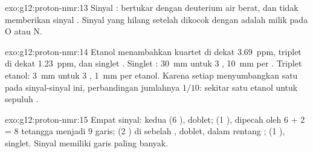 \begin{solution}{exo:g12:proton-nmr:13}
Sinyal :   bertukar dengan deuterium air
berat, dan  tidak memberikan sinyal . Sinyal yang hilang
setelah dikocok dengan  adalah milik  pada O atau N.
\end{solution}

\begin{solution}{exo:g12:proton-nmr:14}
Etanol menambahkan kuartet di dekat \qty{3.69}{ppm}, triplet di dekat
\qty{1.23}{ppm}, dan singlet . Singlet : \qty{30}{mm} untuk
3 , \qty{10}{mm} per  . Triplet etanol: \qty{3}{mm}
untuk 3 , \qty{1}{mm} per  etanol. Karena setiap 
menyumbangkan satu  pada sinyal-sinyal ini, perbandingan
jumlahnya $1/10$: sekitar satu  etanol untuk sepuluh 
.
\end{solution}

\begin{solution}{exo:g12:proton-nmr:15}
Empat sinyal: kedua  (6 ), doblet;  (1 ),
dipecah oleh 6 + 2 = 8 tetangga menjadi 9 garis;  (2 ) di
sebelah , doblet, dalam rentang ;  (1 ),
singlet. Sinyal  memiliki garis paling banyak.
\end{solution}

